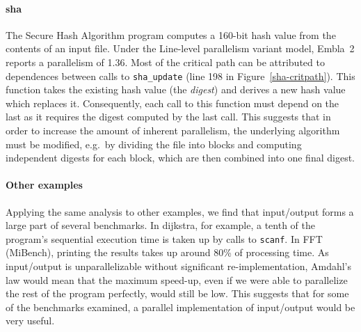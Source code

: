 \paragraph{\textsf{sha}}

The Secure Hash Algorithm program computes a 160-bit hash value from the contents of an input file.
Under the \textsf{Line-level parallelism} variant model, Embla~2 reports a parallelism of 1.36.
Most of the critical path can be attributed to dependences between calls to
\texttt{sha\_update} (line 198 in Figure~\ref{sha-critpath}).
This function takes the existing hash value (the \emph{digest}) and derives a new hash value which replaces it.
Consequently, each call to this function must depend on the last as it requires the digest computed by the last call.
This suggests that in order to increase the amount of inherent parallelism, the underlying algorithm must be modified, e.g.\ by dividing the file into blocks and computing independent digests for each block, which are then combined into one final digest.

\paragraph{Other examples}

Applying the same analysis to other examples, we find that input/output forms a large part of several benchmarks.
In \textsf{dijkstra}, for example, a tenth of the program's sequential execution time is taken up by calls to \texttt{scanf}.
In \textsf{FFT} (MiBench), printing the results takes up around 80\% of processing time.
As input/output is unparallelizable without significant re-implementation, Amdahl's law would mean that the maximum speed-up, even if we were able to parallelize the rest of the program perfectly, would still be low.
This suggests that for some of the benchmarks examined, a parallel implementation of input/output would be very useful.










































